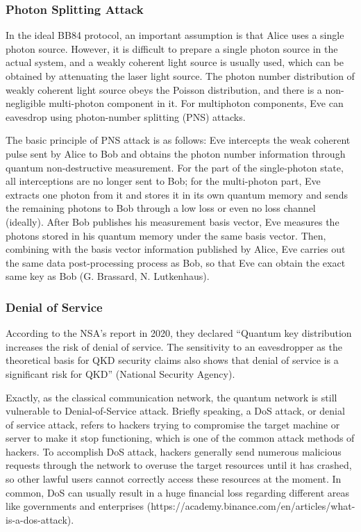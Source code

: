 \documentclass[sigconf]{acmart}
\begin{document}
\subsubsection{Photon Splitting Attack}
In the ideal BB84 protocol, an important assumption is that Alice uses a single photon source. However, it is difficult to prepare a single photon source in the actual system, and a weakly coherent light source is usually used, which can be obtained by attenuating the laser light source. The photon number distribution of weakly coherent light source obeys the Poisson distribution, and there is a non-negligible multi-photon component in it. For multiphoton components, Eve can eavesdrop using photon-number splitting (PNS) attacks.

The basic principle of PNS attack is as follows: Eve intercepts the weak coherent pulse sent by Alice to Bob and obtains the photon number information through quantum non-destructive measurement. For the part of the single-photon state, all interceptions are no longer sent to Bob; for the multi-photon part, Eve extracts one photon from it and stores it in its own quantum memory and sends the remaining photons to Bob through a low loss or even no loss channel (ideally). After Bob publishes his measurement basis vector, Eve measures the photons stored in his quantum memory under the same basis vector. Then, combining with the basis vector information published by Alice, Eve carries out the same data post-processing process as Bob, so that Eve can obtain the exact same key as Bob (G. Brassard, N. Lutkenhaus).

\subsubsection{Denial of Service}
According to the NSA's report in 2020, they declared “Quantum key distribution increases the risk of denial of service. The sensitivity to an eavesdropper as the theoretical basis for QKD security claims also shows that denial of service is a significant risk for QKD” (National Security Agency).

Exactly, as the classical communication network, the quantum network is still vulnerable to Denial-of-Service attack. Briefly speaking, a DoS attack, or denial of service attack, refers to hackers trying to compromise the target machine or server to make it stop functioning, which is one of the common attack methods of hackers. To accomplish DoS attack, hackers generally send numerous malicious requests through the network to overuse the target resources until it has crashed, so other lawful users cannot correctly access these resources at the moment. In common, DoS can usually result in a huge financial loss regarding different areas like governments and enterprises (https://academy.binance.com/en/articles/what-is-a-dos-attack).
\end{document}
